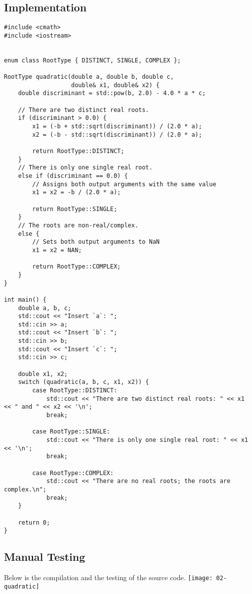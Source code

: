 \documentclass[12pt]{article}
\begin{document}
\subsection{Implementation}
\begin{verbatim}
#include <cmath>
#include <iostream>


enum class RootType { DISTINCT, SINGLE, COMPLEX };

RootType quadratic(double a, double b, double c,
                   double& x1, double& x2) {
    double discriminant = std::pow(b, 2.0) - 4.0 * a * c;

    // There are two distinct real roots.
    if (discriminant > 0.0) {
        x1 = (-b + std::sqrt(discriminant)) / (2.0 * a);
        x2 = (-b - std::sqrt(discriminant)) / (2.0 * a);

        return RootType::DISTINCT;
    }
    // There is only one single real root.
    else if (discriminant == 0.0) {
        // Assigns both output arguments with the same value
        x1 = x2 = -b / (2.0 * a);

        return RootType::SINGLE;
    }
    // The roots are non-real/complex.
    else {
        // Sets both output arguments to NaN
        x1 = x2 = NAN;

        return RootType::COMPLEX;
    }
}

int main() {
    double a, b, c;
    std::cout << "Insert `a`: ";
    std::cin >> a;
    std::cout << "Insert `b`: ";
    std::cin >> b;
    std::cout << "Insert `c`: ";
    std::cin >> c;

    double x1, x2;
    switch (quadratic(a, b, c, x1, x2)) {
        case RootType::DISTINCT:
            std::cout << "There are two distinct real roots: " << x1 << " and " << x2 << '\n';
            break;

        case RootType::SINGLE:
            std::cout << "There is only one single real root: " << x1 << '\n';
            break;

        case RootType::COMPLEX:
            std::cout << "There are no real roots; the roots are complex.\n";
            break;
    }

    return 0;
}
\end{verbatim}

\subsection{Manual Testing}
Below is the compilation and the testing of the source code.
\newline\texttt{[image: 02-quadratic]}
\end{document}
